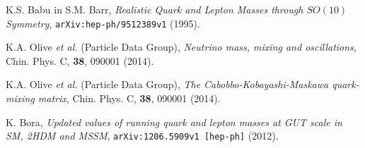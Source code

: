 \documentclass[12pt,a4paper,final,openright,twoside]{report}
\numberwithin{equation}{chapter}
\numberwithin{table}{chapter}
\begin{document}
\begin{thebibliography}{9}
		K.S. Babu in S.M. Barr,
		\emph{Realistic Quark and Lepton Masses through $SO(10)$ Symmetry},
		\texttt{arXiv:hep-ph/9512389v1} (1995).
		
		K.A. Olive {\it et al.} (Particle Data Group),
		\emph{Neutrino mass, mixing and oscillations},
		Chin. Phys. C, {\bf 38}, 090001 (2014).
		
		K.A. Olive {\it et al.} (Particle Data Group),
		\emph{The Cabobbo-Kobayashi-Maskawa quark-mixing matrix},
		Chin. Phys. C, {\bf 38}, 090001 (2014).
		
		K. Bora,
		\emph{Updated values of running quark and lepton masses at GUT scale in SM, 2HDM
		and MSSM},
		\texttt{arXiv:1206.5909v1 [hep-ph]} (2012).
		
\end{thebibliography}
\end{document}
